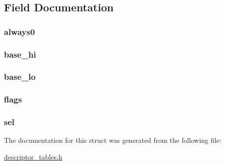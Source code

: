 \subsection{Field Documentation}
\hypertarget{structidt__entry__struct_a9d3c870e7b1697c835095c536ac5b09b}{
\subsubsection[{always0}]{ {\bf always0}}}
\label{structidt__entry__struct_a9d3c870e7b1697c835095c536ac5b09b}
\hypertarget{structidt__entry__struct_a65b35eebe0d81928a3ac5ddb1efe0fc3}{
\subsubsection[{base\_\-hi}]{ {\bf base\_\-hi}}}
\label{structidt__entry__struct_a65b35eebe0d81928a3ac5ddb1efe0fc3}
\hypertarget{structidt__entry__struct_a87eb3dc5d98a750439e08c9e6703778b}{
\subsubsection[{base\_\-lo}]{ {\bf base\_\-lo}}}
\label{structidt__entry__struct_a87eb3dc5d98a750439e08c9e6703778b}
\hypertarget{structidt__entry__struct_a138dda98fcd4738346af61bcca8cf4b4}{
\subsubsection[{flags}]{ {\bf flags}}}
\label{structidt__entry__struct_a138dda98fcd4738346af61bcca8cf4b4}
\hypertarget{structidt__entry__struct_adf6a7546c6355a8f87f34731860b49e1}{
\subsubsection[{sel}]{ {\bf sel}}}
\label{structidt__entry__struct_adf6a7546c6355a8f87f34731860b49e1}


The documentation for this struct was generated from the following file:\begin{DoxyCompactItemize}
\item 
\hyperlink{descriptor__tables_8h}{descriptor\_\-tables.h}\end{DoxyCompactItemize}
